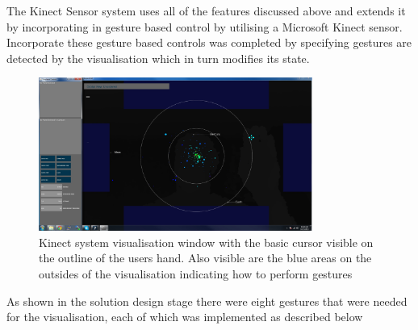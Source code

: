 The Kinect Sensor system uses all of the features discussed above and extends it
by incorporating in gesture based control by utilising a Microsoft Kinect
sensor. Incorporate these gesture based controls was completed by specifying
gestures are detected by the visualisation which in turn modifies its state. 

\clearpage
\begin{figure}[H]
  \centering
      \includegraphics[width=0.8\textwidth]{images/full.jpg}
  \caption[Kinect system visualisation window]{Kinect system visualisation
window with the basic cursor visible on the outline of the users hand. Also
visible are the blue areas on the outsides of the visualisation indicating how
to perform gestures}
  \label{fig:left}
\end{figure}


As
shown in the solution design stage there were eight gestures that were needed
for the visualisation, each of which was implemented as described below

